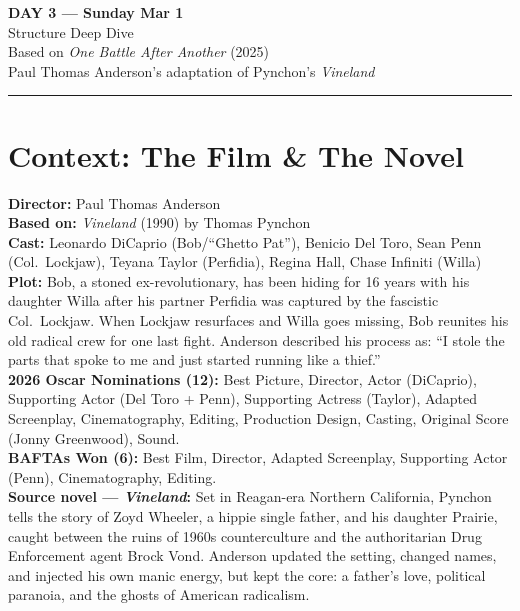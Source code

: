 \documentclass[10pt,a4paper]{article}
\begin{document}
\begin{center}
{\LARGE \textbf{DAY 3 --- Sunday Mar 1}}\\[4pt]
{\large Structure Deep Dive}\\[2pt]
{\normalsize Based on \emph{One Battle After Another} (2025)\\
Paul Thomas Anderson's adaptation of Pynchon's \emph{Vineland}}\\[2pt]
\rule{\textwidth}{0.8pt}
\end{center}

\section*{Context: The Film \& The Novel}

\begin{tcolorbox}[colback=white, colframe=black,
    title=One Battle After Another (2025)]
\textbf{Director:} Paul Thomas Anderson\\
\textbf{Based on:} \emph{Vineland} (1990) by Thomas Pynchon\\
\textbf{Cast:} Leonardo DiCaprio (Bob/``Ghetto Pat''), Benicio Del
Toro, Sean Penn (Col.\ Lockjaw), Teyana Taylor (Perfidia), Regina
Hall, Chase Infiniti (Willa)\\[4pt]
\textbf{Plot:} Bob, a stoned ex-revolutionary, has been hiding for
16 years with his daughter Willa after his partner Perfidia was
captured by the fascistic Col.\ Lockjaw. When Lockjaw resurfaces
and Willa goes missing, Bob reunites his old radical crew for one
last fight. Anderson described his process as: ``I stole the parts
that spoke to me and just started running like a thief.''\\[4pt]
\textbf{2026 Oscar Nominations (12):} Best Picture, Director, Actor
(DiCaprio), Supporting Actor (Del Toro + Penn), Supporting Actress
(Taylor), Adapted Screenplay, Cinematography, Editing, Production
Design, Casting, Original Score (Jonny Greenwood), Sound.\\[4pt]
\textbf{BAFTAs Won (6):} Best Film, Director, Adapted Screenplay,
Supporting Actor (Penn), Cinematography, Editing.\\[4pt]
\textbf{Source novel --- \emph{Vineland}:} Set in Reagan-era
Northern California, Pynchon tells the story of Zoyd Wheeler, a
hippie single father, and his daughter Prairie, caught between the
ruins of 1960s counterculture and the authoritarian Drug Enforcement
agent Brock Vond. Anderson updated the setting, changed names, and
injected his own manic energy, but kept the core: a father's love,
political paranoia, and the ghosts of American radicalism.
\end{tcolorbox}
\end{document}
